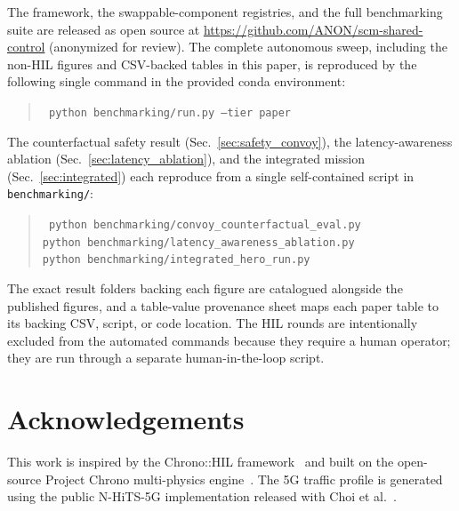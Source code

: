 \documentclass[conference,letterpaper,10pt]{IEEEtran}
\begin{document}
The framework, the swappable-component registries, and the full
benchmarking suite are released as open source at
\url{https://github.com/ANON/scm-shared-control} (anonymized for review).
The complete autonomous sweep, including the non-HIL figures and
CSV-backed tables in this paper, is reproduced by the following single
command in the provided conda environment:
\begin{quote}\small\tt
python benchmarking/run.py --tier paper
\end{quote}
The counterfactual safety result (Sec.~\ref{sec:safety_convoy}), the
latency-awareness ablation (Sec.~\ref{sec:latency_ablation}), and the
integrated mission (Sec.~\ref{sec:integrated}) each reproduce from a single
self-contained script in \texttt{benchmarking/}:
\begin{quote}\scriptsize\tt
python benchmarking/convoy\_counterfactual\_eval.py\\
python benchmarking/latency\_awareness\_ablation.py\\
python benchmarking/integrated\_hero\_run.py
\end{quote}
The exact result folders backing each figure are catalogued alongside
the published figures, and a table-value provenance sheet maps each
paper table to its backing CSV, script, or code location. The HIL
rounds are intentionally excluded from the automated commands because
they require a human operator; they are run through a separate
human-in-the-loop script.

\section*{Acknowledgements}

This work is inspired by the Chrono::HIL framework~\cite{Zhou23} and built on
the open-source Project Chrono multi-physics engine~\cite{Tasora16,Serban19,Krenn09}.
The 5G traffic profile is
generated using the public N-HiTS-5G implementation released with
Choi et al.~\cite{Choi23}.
\end{document}

